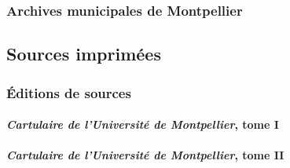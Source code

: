 \nocite{Statuts1383ADH}

\printbibliography[
heading=none,
keyword=src-man-adh
]

\subsubsection*{Archives municipales de Montpellier}

\printbibliography[
heading=none,
keyword=src-man-amm
]

\endgroup

\newpage


\subsection*{Sources imprimées}

\subsubsection*{Éditions de sources}

\paragraph{\emph{Cartulaire de l'Université de Montpellier}, tome I}

\nocite{GermainUniversite1890}

\printbibliography[
heading=none,
keyword=src-cartulaire-tome1
]

\nocite{GuilhemVIII1181,Conrad1220,Statuts1240,AlexandreIV1258,Certificat1260,NicolasIV1289,ClementVAuteurs1309,ClementVChancelier1309,ClementVLicence1309,JeanXXII1323,Statuts1335,Statuts1340,JeanSaintMarc1364,RequeteEtudiants1390,PresentationCadavres1396}

\printbibliography[
heading=none,
keyword=src-cartulaire-actes
]

\paragraph{\emph{Cartulaire de l'Université de Montpellier}, tome II}

